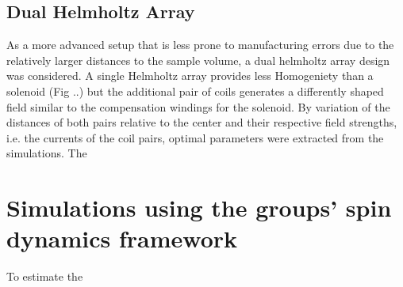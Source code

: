 			\subsection{Dual Helmholtz Array}\label{simulations:DualHelmholtzArray}
			As a more advanced setup that is less prone to manufacturing errors due to the relatively larger distances to the sample volume, a dual helmholtz array design was considered. A single Helmholtz array provides less Homogeniety than a solenoid (Fig ..) but the additional pair of coils generates a differently shaped field similar to the compensation windings for the solenoid. By variation of the distances of both pairs relative to the center and their respective field strengths, i.e. the currents of the coil pairs, optimal parameters were extracted from the simulations. The 
	\section{Simulations using the groups' spin dynamics framework}
		To estimate the 
